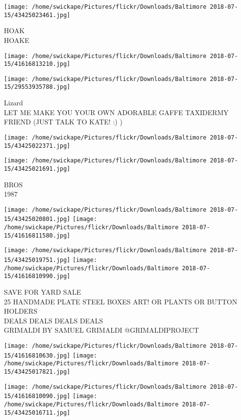 \documentclass[10pt,letterpaper]{article}
\begin{document}
\vspace{0.25in}
\texttt{[image: /home/swickape/Pictures/flickr/Downloads/Baltimore 2018-07-15/43425023461.jpg]}

HOAK\\
HOAKE
\pagebreak

\texttt{[image: /home/swickape/Pictures/flickr/Downloads/Baltimore 2018-07-15/41616813210.jpg]}

\vspace{0.25in}
\texttt{[image: /home/swickape/Pictures/flickr/Downloads/Baltimore 2018-07-15/29553935788.jpg]}

Lizard\\
LET ME MAKE YOU YOUR OWN ADORABLE GAFFE TAXIDERMY FRIEND (JUST TALK TO KATE! :) )
\pagebreak

\texttt{[image: /home/swickape/Pictures/flickr/Downloads/Baltimore 2018-07-15/43425022371.jpg]}

\vspace{0.25in}
\texttt{[image: /home/swickape/Pictures/flickr/Downloads/Baltimore 2018-07-15/43425021691.jpg]}

BROS\\
1987
\pagebreak

\texttt{[image: /home/swickape/Pictures/flickr/Downloads/Baltimore 2018-07-15/43425020801.jpg]}
\texttt{[image: /home/swickape/Pictures/flickr/Downloads/Baltimore 2018-07-15/41616811580.jpg]}

\texttt{[image: /home/swickape/Pictures/flickr/Downloads/Baltimore 2018-07-15/43425019751.jpg]}
\texttt{[image: /home/swickape/Pictures/flickr/Downloads/Baltimore 2018-07-15/41616810990.jpg]}

SAVE FOR YARD SALE\\
25 HANDMADE PLATE STEEL BOXES ART!  OR PLANTS OR BUTTON HOLDERS\\
DEALS DEALS DEALS DEALS\\
GRIMALDI BY SAMUEL GRIMALDI @GRIMALDIPROJECT
\pagebreak

\texttt{[image: /home/swickape/Pictures/flickr/Downloads/Baltimore 2018-07-15/41616810630.jpg]}
\texttt{[image: /home/swickape/Pictures/flickr/Downloads/Baltimore 2018-07-15/43425017821.jpg]}

\texttt{[image: /home/swickape/Pictures/flickr/Downloads/Baltimore 2018-07-15/41616810090.jpg]}
\texttt{[image: /home/swickape/Pictures/flickr/Downloads/Baltimore 2018-07-15/43425016711.jpg]}
\end{document}
